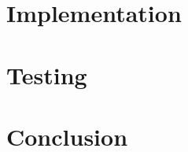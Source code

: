 \documentclass[12pt, letterpaper]{report}
\begin{document}
\clearpage
\chapter{Implementation}


\clearpage
\chapter{Testing}


\clearpage
\chapter{Conclusion}


%		
%		
%	



\end{document}
